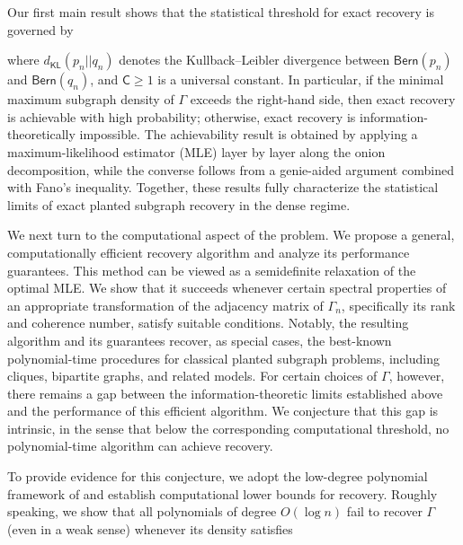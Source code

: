 \documentclass[12pt]{article}
\newcommand{\s}[1]{\mathsf{#1}}
\begin{document}
Our first main result shows that the statistical threshold for exact recovery is governed by
\centerline{\noindent\fbox{\parbox[t][1cm][c]{0.4\textwidth}{
\begin{align*}
\mu_{\s{min}}(\Gamma_n)\mathop{\gtrless}\limits_{\s{Impossible}}^{\s{Possible}}\s{C}\frac{\log n}{d_{\s{KL}}(p_n||q_n)}\,,
\end{align*}}}}
\vspace{0.2cm}

\noindent where $d_{\s{KL}}(p_n||q_n)$ denotes the Kullback--Leibler divergence between $\s{Bern}(p_n)$ and $\s{Bern}(q_n)$, and $\s{C}\geq 1$ is a universal constant. In particular, if the minimal maximum subgraph density of $\Gamma$ exceeds the right-hand side, then exact recovery is achievable with high probability; otherwise, exact recovery is information-theoretically impossible. The achievability result is obtained by applying a maximum-likelihood estimator (MLE) layer by layer along the onion decomposition, while the converse follows from a genie-aided argument combined with Fano's inequality. Together, these results fully characterize the statistical limits of exact planted subgraph recovery in the dense regime.

We next turn to the computational aspect of the problem. We propose a general, computationally efficient recovery algorithm and analyze its performance guarantees. This method can be viewed as a semidefinite relaxation of the optimal MLE. We show that it succeeds whenever certain spectral properties of an appropriate transformation of the adjacency matrix of $\Gamma_n$, specifically its rank and coherence number, satisfy suitable conditions. Notably, the resulting algorithm and its guarantees recover, as special cases, the best-known polynomial-time procedures for classical planted subgraph problems, including cliques, bipartite graphs, and related models. For certain choices of $\Gamma$, however, there remains a gap between the information-theoretic limits established above and the performance of this efficient algorithm. We conjecture that this gap is intrinsic, in the sense that below the corresponding computational threshold, no polynomial-time algorithm can achieve recovery.

To provide evidence for this conjecture, we adopt the low-degree polynomial framework of \cite{SchrammWein2022} and establish computational lower bounds for recovery. Roughly speaking, we show that all polynomials of degree $O(\log n)$ fail to recover $\Gamma$ (even in a weak sense) whenever its density satisfies
\end{document}
